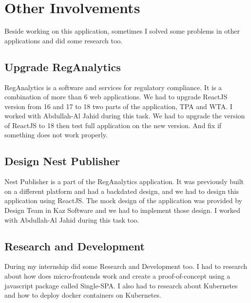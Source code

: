 \section{Other Involvements}

Beside working on this application, sometimes I solved some problems in other applications and did some research too.

\subsection{Upgrade RegAnalytics}

RegAnalytics is a software and services for regulatory compliance.
It is a combination of more than 6 web applications.
We had to upgrade ReactJS version from 16 and 17 to 18 two parts of the application, TPA and WTA.
I worked with Abdullah-Al Jahid during this task.
We had to upgrade the version of ReactJS to 18 then test full application on the new version.
And fix if something does not work properly.

\subsection{Design Nest Publisher}

Nest Publisher is a part of the RegAnalytics application.
It was previously built on a different platform and had a backdated design, and we had to design this application using ReactJS.
The mock design of the application was provided by Design Team in Kaz Software and we had to implement those design.
I worked with Abdullah-Al Jahid during this task too.

\subsection{Research and Development}

During my internship did some Research and Development too.
I had to research about how does micro-frontends work and create a proof-of-concept using a javascript package called Single-SPA.
I also had to research about Kubernetes and how to deploy docker containers on Kubernetes.